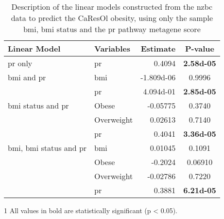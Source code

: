 	\begin{table}[htpb]
		\centering
		\caption[Description of the linear models constructed from the \gls{nzbc} data to predict the CaResOl obesity, using only the sample \gls{bmi}, \gls{bmi} status and the \acrshort{pr} pathway metagene score]{Description of the linear models constructed from the \gls{nzbc} data to predict the CaResOl obesity, using only the sample \gls{bmi}, \gls{bmi} status and the \gls{pr} pathway metagene score}
		\label{tab:lm_pr_only_caresol}
		\begin{threeparttable}
			\begin{tabular}{llrc}
				Linear Model & Variables & Estimate & {P-value}\\
					\hline
					\hline
					\rule{0pt}{2.25ex}\gls{pr} only                            & \gls{pr}   & 0.4094     & \bfseries \num{2.58d-05} \tnote{1}\\
					\hline
					\rule{0pt}{2.25ex}\gls{bmi} and \gls{pr}                   & \gls{bmi}  & -1.809d-06 & 0.9996   \\
                                                                               & \gls{pr}   & 4.094d-01  & \bfseries \num{2.85d-05} \\
					\hline
					\rule{0pt}{2.25ex}\gls{bmi} status and \gls{pr}            & Obese      & -0.05775   & 0.3740   \\
                                                                               & Overweight & 0.02613    & 0.7140   \\
                                                                               & \gls{pr}   & 0.4041     & \bfseries \num{3.36d-05} \\
					\hline
					\rule{0pt}{2.25ex}\gls{bmi}, \gls{bmi} status and \gls{pr} & \gls{bmi}  & 0.01045    & 0.1091   \\
                                                                               & Obese      & -0.2024    & 0.06910  \\
                                                                               & Overweight & -0.02786   & 0.7220   \\
                                                                               & \gls{pr}   & 0.3881     & \bfseries \num{6.21d-05} \\
					\hline
					\hline
			\end{tabular}
				\begin{tablenotes}
					\begin{footnotesize}
					\item [1] All values in bold are statistically significant (p \textless{} 0.05).
					\end{footnotesize}
				\end{tablenotes}
		\end{threeparttable}
	\end{table}

